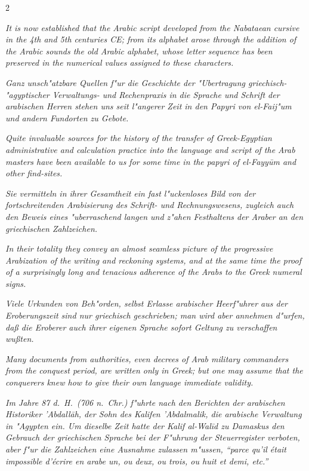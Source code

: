 \documentclass[10pt,a4paper]{article}
\newcommand{\enquote}[1]{``#1''}
\begin{document}
\begin{paracol}{2}
\switchcolumn

\textit{It is now established that the Arabic script developed from the Nabataean cursive in the 4th and 5th centuries CE; from its alphabet arose through the addition of the Arabic sounds the old Arabic alphabet, whose letter sequence has been preserved in the numerical values assigned to these characters.}

\switchcolumn*

\textit{Ganz unsch"atzbare Quellen f"ur die Geschichte der "Ubertragung griechisch-"agyptischer Verwaltungs- und Rechenpraxis in die Sprache und Schrift der arabischen Herren stehen uns seit l"angerer Zeit in den Papyri von el-Faij"um und andern Fundorten zu Gebote.}

\switchcolumn

\textit{Quite invaluable sources for the history of the transfer of Greek-Egyptian administrative and calculation practice into the language and script of the Arab masters have been available to us for some time in the papyri of el-Fayy\=um and other find-sites.}

\switchcolumn*

\textit{Sie vermitteln in ihrer Gesamtheit ein fast l"uckenloses Bild von der fortschreitenden Arabisierung des Schrift- und Rechnungswesens, zugleich auch den Beweis eines "uberraschend langen und z"ahen Festhaltens der Araber an den griechischen Zahlzeichen.}

\switchcolumn

\textit{In their totality they convey an almost seamless picture of the progressive Arabization of the writing and reckoning systems, and at the same time the proof of a surprisingly long and tenacious adherence of the Arabs to the Greek numeral signs.}

\switchcolumn*

\textit{Viele Urkunden von Beh"orden, selbst Erlasse arabischer Heerf"uhrer aus der Eroberungszeit sind nur griechisch geschrieben; man wird aber annehmen d"urfen, da\ss{} die Eroberer auch ihrer eigenen Sprache sofort Geltung zu verschaffen wu\ss{}ten.}

\switchcolumn

\textit{Many documents from authorities, even decrees of Arab military commanders from the conquest period, are written only in Greek; but one may assume that the conquerers knew how to give their own language immediate validity.}

\switchcolumn*

\textit{Im Jahre 87 d.\ H.\ (706 n.\ Chr.) f"uhrte nach den Berichten der arabischen Historiker 'Abdall\=ah, der Sohn des Kalifen 'Abdalmalik, die arabische Verwaltung in "Agypten ein. Um dieselbe Zeit hatte der Kalif al-Wal\={i}d zu Damaskus den Gebrauch der griechischen Sprache bei der F"uhrung der Steuerregister verboten, aber f"ur die Zahlzeichen eine Ausnahme zulassen m"ussen, \enquote{parce qu'il \'etait impossible d'\'ecrire en arabe un, ou deux, ou trois, ou huit et demi, etc.}}


\end{paracol}
\end{document}
